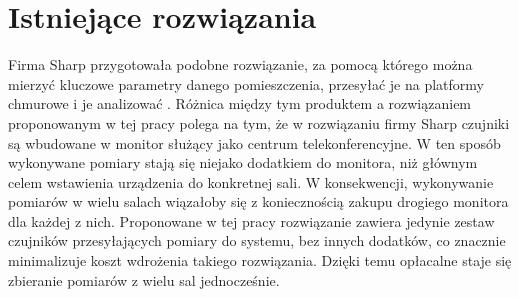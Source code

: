 \newpage
\section{Istniejące rozwiązania}
Firma Sharp przygotowała podobne rozwiązanie, za pomocą którego można mierzyć kluczowe 
parametry danego pomieszczenia, przesyłać je na platformy chmurowe i je analizować 
\cite{sharp2022}. Różnica między tym produktem a rozwiązaniem proponowanym w tej pracy 
polega na tym, że w rozwiązaniu firmy Sharp czujniki są wbudowane w monitor służący 
jako centrum telekonferencyjne. W ten sposób wykonywane pomiary stają się niejako 
dodatkiem do monitora, niż głównym celem wstawienia urządzenia do konkretnej sali. 
W konsekwencji, wykonywanie pomiarów w wielu salach wiązałoby się z koniecznością 
zakupu drogiego monitora dla każdej z nich. Proponowane w tej pracy rozwiązanie zawiera 
jedynie zestaw czujników przesyłających pomiary do systemu, bez innych dodatków, co 
znacznie minimalizuje koszt wdrożenia takiego rozwiązania. Dzięki temu opłacalne staje
się zbieranie pomiarów z wielu sal jednocześnie.